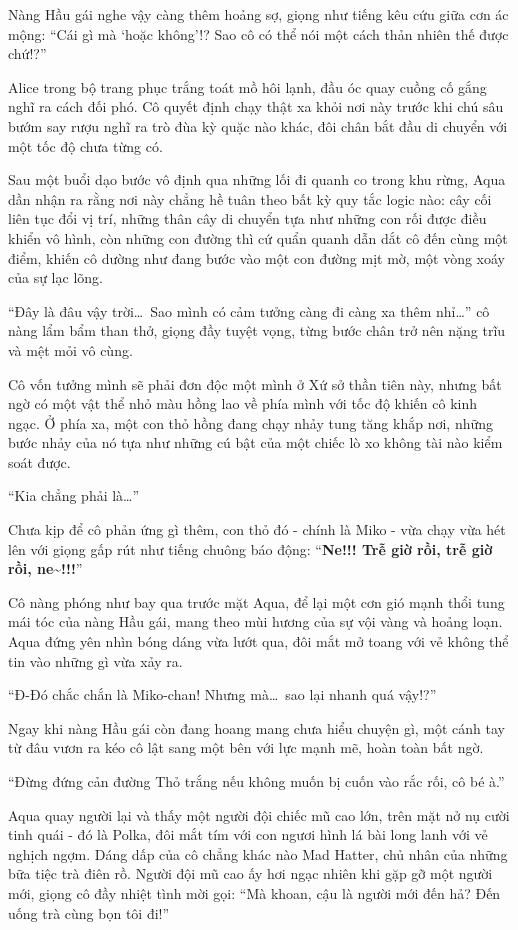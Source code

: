 \documentclass[../main.tex]{subfiles}
\begin{document}
Nàng Hầu gái nghe vậy càng thêm hoảng sợ, giọng như tiếng kêu cứu giữa cơn ác mộng: ``Cái gì mà `hoặc không'!? Sao cô có thể nói một cách thản nhiên thế được chứ!?''

Alice trong bộ trang phục trắng toát mồ hôi lạnh, đầu óc quay cuồng cố gắng nghĩ ra cách đối phó. Cô quyết định chạy thật xa khỏi nơi này trước khi chú sâu bướm say rượu nghĩ ra trò đùa kỳ quặc nào khác, đôi chân bắt đầu di chuyển với một tốc độ chưa từng có.

\ct

Sau một buổi dạo bước vô định qua những lối đi quanh co trong khu rừng, Aqua dần nhận ra rằng nơi này chẳng hề tuân theo bất kỳ quy tắc logic nào: cây cối liên tục đổi vị trí, những thân cây di chuyển tựa như những con rối được điều khiển vô hình, còn những con đường thì cứ quẩn quanh dẫn dắt cô đến cùng một điểm, khiến cô dường như đang bước vào một con đường mịt mờ, một vòng xoáy của sự lạc lõng.

``Đây là đâu vậy trời\dots\ Sao mình có cảm tưởng càng đi càng xa thêm nhỉ\dots'' cô nàng lẩm bẩm than thở, giọng đầy tuyệt vọng, từng bước chân trở nên nặng trĩu và mệt mỏi vô cùng.

Cô vốn tưởng mình sẽ phải đơn độc một mình ở Xứ sở thần tiên này, nhưng bất ngờ có một vật thể nhỏ màu hồng lao về phía mình với tốc độ khiến cô kinh ngạc. Ở phía xa, một con thỏ hồng đang chạy nhảy tung tăng khắp nơi, những bước nhảy của nó tựa như những cú bật của một chiếc lò xo không tài nào kiểm soát được.

``Kia chẳng phải là\dots''

Chưa kịp để cô phản ứng gì thêm, con thỏ đó - chính là Miko - vừa chạy vừa hét lên với giọng gấp rút như tiếng chuông báo động: ``\textbf{Ne!!! Trễ giờ rồi, trễ giờ rồi, ne\~{}!!!}''

Cô nàng phóng như bay qua trước mặt Aqua, để lại một cơn gió mạnh thổi tung mái tóc của nàng Hầu gái, mang theo mùi hương của sự vội vàng và hoảng loạn. Aqua đứng yên nhìn bóng dáng vừa lướt qua, đôi mắt mở toang với vẻ không thể tin vào những gì vừa xảy ra.

``Đ-Đó chắc chắn là Miko-chan! Nhưng mà\dots\ sao lại nhanh quá vậy!?''

Ngay khi nàng Hầu gái còn đang hoang mang chưa hiểu chuyện gì, một cánh tay từ đâu vươn ra kéo cô lật sang một bên với lực mạnh mẽ, hoàn toàn bất ngờ.

``Đừng đứng cản đường Thỏ trắng nếu không muốn bị cuốn vào rắc rối, cô bé à.''

Aqua quay người lại và thấy một người đội chiếc mũ cao lớn, trên mặt nở nụ cười tinh quái - đó là Polka, đôi mắt tím với con ngươi hình lá bài long lanh với vẻ nghịch ngợm. Dáng dấp của cô chẳng khác nào Mad Hatter, chủ nhân của những bữa tiệc trà điên rồ. Người đội mũ cao ấy hơi ngạc nhiên khi gặp gỡ một người mới, giọng cô đầy nhiệt tình mời gọi: ``Mà khoan, cậu là người mới đến hả? Đến uống trà cùng bọn tôi đi!''
\end{document}

